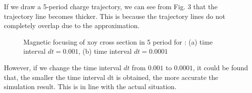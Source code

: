 \documentclass[journal,twocolumn,letterpaper]{IEEEJERM}
\begin{document}
If we draw a 5-period charge trajectory, we can see from Fig. 3 that the trajectory line becomes thicker. This is because the trajectory lines do not completely overlap due to the approximation. 

\begin{figure}[H]   
	\centering	  
	    \label{1a}\hfill	  
	\label{1b}
	\caption{Magnetic focusing of xoy cross section in 5 period for : (a) time interval $ dt=0.001 $, (b) time interval $ dt=0.0001 $}	  
	\label{fig3} 
\end{figure}
However, if we change the time interval $ dt $ from $ 0.001 $ to $ 0.0001 $,  it could  be found that, the smaller the time interval dt is obtained, the more accurate the simulation result. This is in line with the actual situation. 
\end{document}
